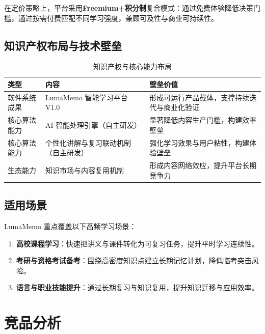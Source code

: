 在定价策略上，平台采用\textbf{Freemium+积分制}复合模式：通过免费体验降低决策门槛，通过按需付费匹配不同学习强度，兼顾可及性与商业可持续性。

\subsection{知识产权布局与技术壁垒}

\begin{table}[htbp]
	\centering
	\caption{知识产权与核心能力布局}
	\label{tab:chap3_ip}
	\begin{tabular}{p{3.0cm}p{4.0cm}p{5.7cm}}
		\toprule
		\textbf{类型} & \textbf{内容} & \textbf{壁垒价值} \\
		\midrule
		软件系统成果 & LumaMemo 智能学习平台 V1.0 & 形成可运行产品载体，支撑持续迭代与商业化验证 \\
		核心算法能力 & AI 智能处理引擎（自主研发） & 显著降低内容生产门槛，构建效率壁垒 \\
		核心算法能力 & 个性化讲解与复习联动机制（自主研发） & 强化学习效果与用户粘性，构建体验壁垒 \\
		生态能力 & 知识市场与内容复用机制 & 形成内容网络效应，提升平台长期竞争力 \\
		\bottomrule
	\end{tabular}
\end{table}

\subsection{适用场景}

LumaMemo 重点覆盖以下高频学习场景：

\begin{enumerate}[leftmargin=2em]
	\item \textbf{高校课程学习}：快速把讲义与课件转化为可复习任务，提升平时学习连续性。
	\item \textbf{考研与资格考试备考}：围绕高密度知识点建立长期记忆计划，降低临考突击风险。
	\item \textbf{语言与职业技能提升}：通过长期复习与知识复用，提升知识迁移与应用效率。
\end{enumerate}

\section{竞品分析}

